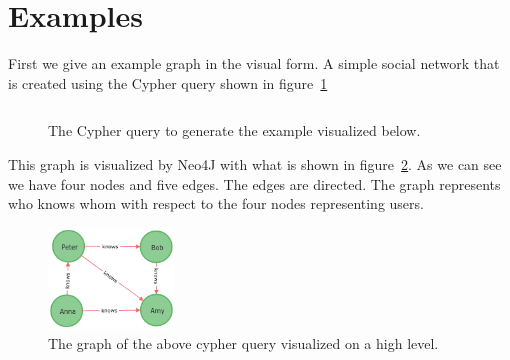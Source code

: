 \documentclass[a4paper,10pt]{article}
\begin{document}
\section{Examples}
    First we give an example graph in the visual form. A simple social network that is created using the Cypher query shown in figure~\ref{ex_q}
    \begin{figure}[htp]\label{ex_q}
        \begin{center}
            \inputminted{Cypher}{code/example_query.cy}
        \end{center}
        \caption{The Cypher query to generate the example visualized below.} %
    \end{figure}
    This graph is visualized by Neo4J with what is shown in figure~\ref{graph}. As we can see we have four nodes and five edges. The edges are directed. The graph represents who knows whom with respect to the four nodes representing users.
    \begin{figure}[htp]\label{graph}
        \begin{center}
            \includegraphics[keepaspectratio,height=0.3\textheight,width=0.3\textwidth]{img/04_example/graph.png}
        \end{center}
        \caption{The graph of the above cypher query visualized on a high level.} %
    \end{figure}
    
\end{document}
